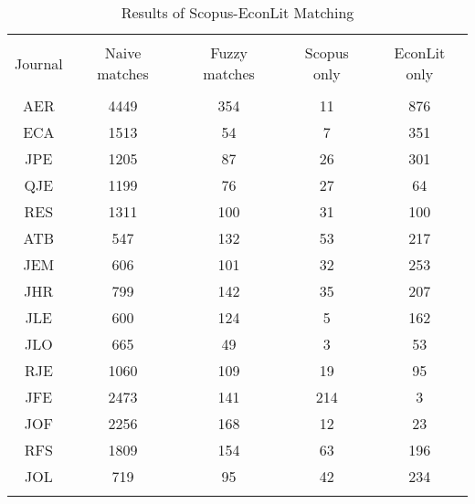 
\begin{table}[!htbp] \centering 
  \caption{Results of Scopus-EconLit Matching} 
  \label{} 
\begin{tabular}{@{\extracolsep{5pt}} ccccc} 
\\[-1.8ex]\hline 
\hline \\[-1.8ex] 
Journal & Naive matches & Fuzzy matches & Scopus only & EconLit only \\ 
\hline \\[-1.8ex] 
AER & 4449 & 354 & 11 & 876 \\ 
ECA & 1513 & 54 & 7 & 351 \\ 
JPE & 1205 & 87 & 26 & 301 \\ 
QJE & 1199 & 76 & 27 & 64 \\ 
RES & 1311 & 100 & 31 & 100 \\ 
ATB & 547 & 132 & 53 & 217 \\ 
JEM & 606 & 101 & 32 & 253 \\ 
JHR & 799 & 142 & 35 & 207 \\ 
JLE & 600 & 124 & 5 & 162 \\ 
JLO & 665 & 49 & 3 & 53 \\ 
RJE & 1060 & 109 & 19 & 95 \\ 
JFE & 2473 & 141 & 214 & 3 \\ 
JOF & 2256 & 168 & 12 & 23 \\ 
RFS & 1809 & 154 & 63 & 196 \\ 
JOL & 719 & 95 & 42 & 234 \\ 
\hline \\[-1.8ex] 
\end{tabular} 
\end{table} 
